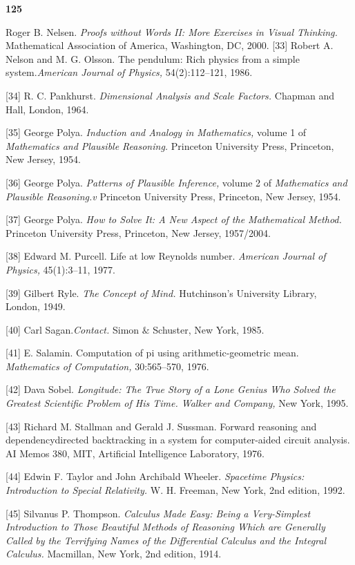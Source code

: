 \documentclass[b5paper]{article}
\begin{document}
\large\hfill \textbf{125} \\
\normalsize\date{}
\normalsize\pagestyle{empty}
\begin{flushleft}
[32] Roger B. Nelsen.
\emph{Proofs without Words II: More Exercises in Visual Thinking.}
Mathematical Association of America, Washington, DC, 2000.
[33] Robert A. Nelson and M. G. Olsson. The pendulum: Rich physics from a simple
system.\emph{American Journal of Physics,}  54(2):112–121, 1986.

[34] R. C. Pankhurst. \emph{Dimensional Analysis and Scale Factors.} Chapman and Hall, London,
1964.

[35] George Polya. \emph{Induction and Analogy in Mathematics,} volume 1 of \emph{Mathematics and Plausible Reasoning.} Princeton University Press, Princeton, New Jersey, 1954.

[36] George Polya. \emph{Patterns of Plausible Inference, }volume 2 of\emph{ Mathematics and Plausible Reasoning.v} Princeton University Press, Princeton, New Jersey, 1954.

[37] George Polya. \emph{How to Solve It: A New Aspect of the Mathematical Method. }Princeton University Press, Princeton, New Jersey, 1957/2004.

[38] Edward M. Purcell. Life at low Reynolds number. \emph{American Journal of Physics,
}45(1):3–11, 1977.

[39] Gilbert Ryle. \emph{The Concept of Mind.} Hutchinson’s University Library, London, 1949.

[40] Carl Sagan.\emph{Contact.}  Simon $\&$ Schuster, New York, 1985.

[41] E. Salamin. Computation of pi using arithmetic-geometric mean.\emph{ Mathematics of
Computation,} 30:565–570, 1976.

[42] Dava Sobel.\emph{ Longitude: The True Story of a Lone Genius Who Solved the Greatest
Scientific Problem of His Time. Walker and Company,} New York, 1995.

[43] Richard M. Stallman and Gerald J. Sussman. Forward reasoning and dependencydirected
backtracking in a system for computer-aided circuit analysis. AI Memos
380, MIT, Artificial Intelligence Laboratory, 1976.

[44] Edwin F. Taylor and John Archibald Wheeler.\emph{ Spacetime Physics: Introduction to
Special Relativity.} W. H. Freeman, New York, 2nd edition, 1992.

[45] Silvanus P. Thompson.\emph{ Calculus Made Easy: Being a Very-Simplest Introduction to
Those Beautiful Methods of Reasoning Which are Generally Called by the Terrifying
Names of the Differential Calculus and the Integral Calculus.} Macmillan, New York,
2nd edition, 1914.


\end{flushleft}
\end{document}
